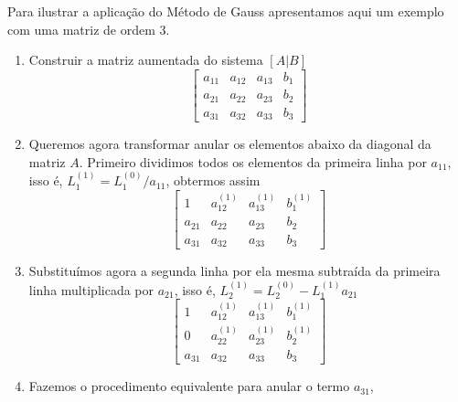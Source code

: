 \begin{exemplos}[2]
       
    \begin{exemplo}
        Para ilustrar a aplicação do Método de Gauss apresentamos aqui um exemplo com uma matriz de ordem 3.
        \begin{enumerate}
            \item Construir a matriz aumentada do sistema $[ A | B ]$
                \[ \left[
                \begin{array}{ccc|c}
                   	a_{11} & a_{12} & a_{13} & b_{1} \\
                   	a_{21} & a_{22} & a_{23} & b_{2} \\
                   	a_{31} & a_{32} & a_{33} & b_{3}
                \end{array} 
                \right]
                \]
            \item Queremos agora transformar anular os elementos abaixo da diagonal da matriz $A$. 
                Primeiro dividimos todos os elementos da primeira linha por $a_{11}$, 
                isso é, $L_1^{(1)} = L_1^{(0)} / a_{11}$, obtermos assim
                \[ \left[
                \begin{array}{ccc|c}
                 	  1    & a_{12}^{(1)} & a_{13}^{(1)} & b_{1}^{(1)} \\
                   	a_{21} &    a_{22}    &    a_{23}    &    b_{2}    \\
                   	a_{31} &    a_{32}    &    a_{33}    &    b_{3}
                \end{array} 
                \right] \]
            \item Substituímos agora a segunda linha por ela mesma subtraída da primeira linha multiplicada 
                por $a_{21}$, isso é, $L_2^{(1)} = L_2^{(0)} - L_1^{(1)}a_{21}$
                \[ \left[
                \begin{array}{ccc|c}
                 	  1    & a_{12}^{(1)} & a_{13}^{(1)} & b_{1}^{(1)} \\
                 	  0    & a_{22}^{(1)} & a_{23}^{(1)} & b_{2}^{(1)} \\
                   	a_{31} &    a_{32}    &    a_{33}    &    b_{3}
                \end{array} 
                \right] \]
            \item Fazemos o procedimento equivalente para anular o termo $a_{31}$, 

\end{enumerate}
\end{exemplo}
\end{exemplos}
